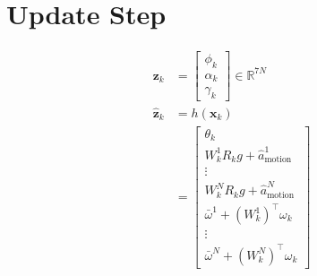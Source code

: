 \documentclass[11pt]{article}
\begin{document}
\section{Update Step}
\begin{align*}
    \mathbf{z}_k &= \begin{bmatrix}
        \phi_k \\ \alpha_k \\ \gamma_k
    \end{bmatrix} \in \mathbb{R}^{7N} \\
    \hat{\mathbf{z}}_k &= h(\mathbf{x}_k) \\
    &= \begin{bmatrix}
        \theta_k \\
        W_k^1 R_k g + \hat{a}^1_{\text{motion}} \\
        \vdots \\
        W_k^N R_k g + \hat{a}^N_{\text{motion}} \\
        \bar{\omega}^1 + (W_k^1)^\top \omega_k \\
        \vdots \\
        \bar{\omega}^N + (W_k^N)^\top \omega_k
    \end{bmatrix} \\
\end{align*}
\end{document}
